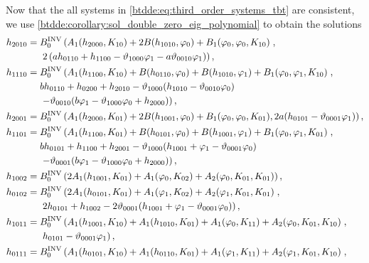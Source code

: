 Now that the all systems in \cref{btdde:eq:third_order_systems_tbt} are consistent,
we use \cref{btdde:corollary:sol_double_zero_eig_polynomial} to obtain the solutions
\begin{equation}
\label{btdde:eq:third_order_systems_solutions_tbt}
\begin{aligned}
h_{2010} ={}& \BINV 0 \left(A_1(h_{2000},K_{10})+ 2 B(h_{1010},\phi_0) + B_1(\phi_0,\phi_0,K_{10}) \right., \\
            & \left. 2 \left(a h_{0110} + h_{1100} - \vartheta_{1000} \phi_1 - a \vartheta_{0010} \phi_1   \right)\right), \\
h_{1110} ={}& \BINV 0 \left(A_1(h_{1100},K_{10}) + B(h_{0110},\phi_0) + B(h_{1010},\phi_1) + B_1(\phi_0,\phi_1,K_{10})\right., \\
            & b h_{0110} + h_{0200} + h_{2010} - \vartheta_{1000} (h_{1010} - \vartheta_{0010} \phi_0) \\
            & \left. - \vartheta_{0010} (b \phi_1 - \vartheta_{1000} \phi_0 + h_{2000})  \right), \\
h_{2001} ={}& \BINV 0 \left( A_1(h_{2000},K_{01}) + 2 B(h_{1001},\phi_0) + B_1(\phi_0,\phi_0,K_{01}), 2 a (h_{0101} - \vartheta_{0001} \phi_1) \right), \\
h_{1101} ={}& \BINV 0 \left(A_1(h_{1100},K_{01}) + B(h_{0101},\phi_0) + B(h_{1001},\phi_1) + B_1(\phi_0,\phi_1,K_{01})\right., \\
            & b h_{0101} + h_{1100} + h_{2001} - \vartheta_{1000} (h_{1001} + \phi_1 - \vartheta_{0001} \phi_0) \\
            & \left. - \vartheta_{0001} (b \phi_1 - \vartheta_{1000} \phi_0 + h_{2000}) \right), \\
h_{1002} ={}& \BINV 0 \left(2 A_1(h_{1001},K_{01}) + A_1(\phi_0,K_{02}) + A_2(\phi_0,K_{01},K_{01})\right), \\
h_{0102} ={}& \BINV 0 \left(2 A_1(h_{0101},K_{01}) + A_1(\phi_1,K_{02}) + A_2(\phi_1,K_{01},K_{01})\right., \\
            & \left. 2 h_{0101} + h_{1002} - 2 \vartheta_{0001} (h_{1001} + \phi_1 - \vartheta_{0001} \phi_0) \right), \\
h_{1011} ={}& \BINV 0 \left(A_1(h_{1001},K_{10}) + A_1(h_{1010},K_{01}) + A_1(\phi_0,K_{11}) + A_2(\phi_0,K_{01},K_{10})\right., \\
            & \left. h_{0101} - \vartheta_{0001} \phi_1\right), \\
h_{0111} ={}& \BINV 0 \left(A_1(h_{0101},K_{10}) + A_1(h_{0110},K_{01}) + A_1(\phi_1,K_{11}) + A_2(\phi_1,K_{01},K_{10})\right., \\

\end{aligned}
\end{equation}
